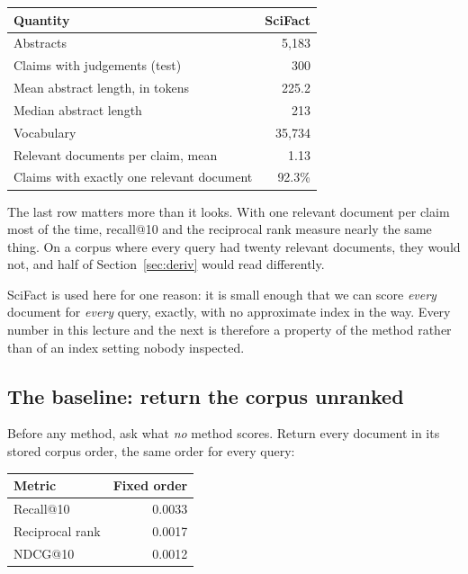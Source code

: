 \documentclass[11pt,a4paper]{article}
\begin{document}
\begin{center}
\small
\begin{tabular}{lr}
\toprule
\textbf{Quantity} & \textbf{SciFact} \\
\midrule
Abstracts                                  & 5{,}183 \\
Claims with judgements (test)              & 300 \\
Mean abstract length, in tokens            & 225.2 \\
Median abstract length                     & 213 \\
Vocabulary                                 & 35{,}734 \\
Relevant documents per claim, mean         & 1.13 \\
Claims with exactly one relevant document  & 92.3\% \\
\bottomrule
\end{tabular}
\end{center}

The last row matters more than it looks. With one relevant document per claim
most of the time, recall@10 and the reciprocal rank measure nearly the same
thing. On a corpus where every query had twenty relevant documents, they would
not, and half of Section~\ref{sec:deriv} would read differently.

SciFact is used here for one reason: it is small enough that we can score
\emph{every} document for \emph{every} query, exactly, with no approximate
index in the way. Every number in this lecture and the next is therefore a
property of the method rather than of an index setting nobody inspected.

\subsection{The baseline: return the corpus unranked}

Before any method, ask what \emph{no} method scores. Return every document in
its stored corpus order, the same order for every query:

\begin{center}
\small
\begin{tabular}{lr}
\toprule
\textbf{Metric} & \textbf{Fixed order} \\
\midrule
Recall@10        & 0.0033 \\
Reciprocal rank  & 0.0017 \\
NDCG@10          & 0.0012 \\
\bottomrule
\end{tabular}
\end{center}
\end{document}
